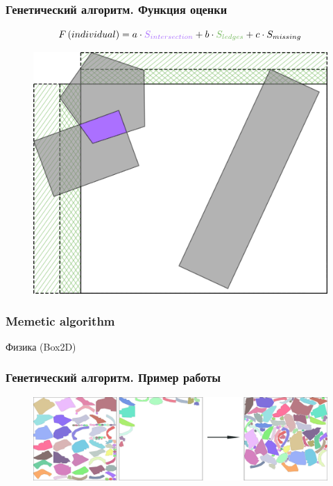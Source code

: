 \documentclass[10pt, unicode]{beamer}
\begin{document}
    \begin{frame}
        \frametitle{Генетический алгоритм. Функция оценки}
        \[
            F\left(individual\right) = a \cdot \textcolor{Intersection}{S_{intersection}} + b \cdot \textcolor{Ledges}{S_{ledges}} + c \cdot S_{missing}
        \]
        \begin{figure}[H]
            \centering
            \includegraphics[scale=0.05]{2.png}
        \end{figure}
    \end{frame}
    \begin{frame}
        \frametitle{Memetic algorithm}
        Физика (Box2D)
    \end{frame}
    \begin{frame}
        \frametitle{Генетический алгоритм. Пример работы}
        \begin{figure}[H]
            \centering
            \includegraphics[width=\linewidth, keepaspectratio]{1.png}
        \end{figure}
    \end{frame}
\end{document}
